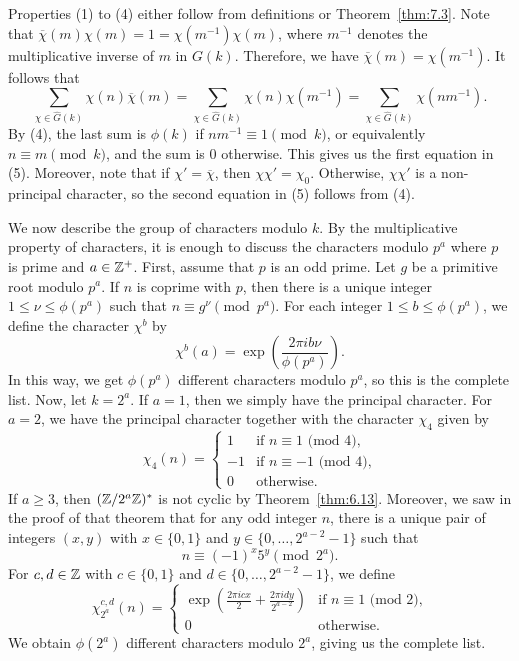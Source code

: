 \newpage 
\begin{pf}
    Properties (1) to (4) either follow from definitions or Theorem~\ref{thm:7.3}. 
    Note that $\overline\chi(m) \chi(m) = 1 = \chi(m^{-1}) \chi(m)$, 
    where $m^{-1}$ denotes the multiplicative inverse of $m$ in $G(k)$. Therefore, 
    we have $\overline\chi(m) = \chi(m^{-1})$. It follows that 
    \[ \sum_{\chi\in\hat G(k)} \chi(n) \overline\chi(m) 
    = \sum_{\chi\in\hat G(k)} \chi(n) \chi(m^{-1}) 
    = \sum_{\chi\in\hat G(k)} \chi(nm^{-1}). \] 
    By (4), the last sum is $\phi(k)$ if $nm^{-1} \equiv 1 \pmod k$, or equivalently 
    $n \equiv m \pmod k$, and the sum is $0$ otherwise. This gives us the first 
    equation in (5). Moreover, note that if $\chi' = \overline\chi$, then 
    $\chi\chi' = \chi_0$. Otherwise, $\chi\chi'$ is a non-principal character, 
    so the second equation in (5) follows from (4). 
\end{pf}

We now describe the group of characters modulo $k$. By the multiplicative property 
of characters, it is enough to discuss the characters modulo $p^a$ where $p$ is 
prime and $a \in \mathbb{Z}^+$. First, assume that $p$ is an odd prime. Let $g$ be a 
primitive root modulo $p^a$. If $n$ is coprime with $p$, then there is a unique 
integer $1 \leq \nu \leq \phi(p^a)$ such that $n \equiv g^\nu \pmod{p^a}$. 
For each integer $1 \leq b \leq \phi(p^a)$, we define the character $\chi^b$ by 
\[ \chi^b(a) = \exp\left( \frac{2\pi ib\nu}{\phi(p^a)} \right). \] 
In this way, we get $\phi(p^a)$ different characters modulo $p^a$, so this is the 
complete list. Now, let $k = 2^a$. If $a = 1$, then we simply have the principal 
character. For $a = 2$, we have the principal character together with the character 
$\chi_4$ given by 
\[ \chi_4(n) = \begin{cases}
    1 & \text{if } n \equiv 1 \text{ (mod $4$),} \\ 
    -1 & \text{if } n \equiv -1 \text{ (mod $4$),} \\ 
    0 & \text{otherwise.}
\end{cases} \] 
If $a \geq 3$, then $(\mathbb{Z}/2^a\mathbb{Z})^*$ is not cyclic by Theorem~\ref{thm:6.13}. 
Moreover, we saw in the proof of that theorem that for any odd integer $n$, 
there is a unique pair of integers $(x, y)$ with $x \in \{0, 1\}$ and 
$y \in \{0, \dots, 2^{a-2}-1\}$ such that 
\[ n \equiv (-1)^x 5^y \pmod{2^a}. \] 
For $c, d \in \mathbb{Z}$ with $c \in \{0, 1\}$ and $d \in \{0, \dots, 2^{a-2}-1\}$, we define 
\[ \chi_{2^a}^{c,d}(n) = \begin{cases}
    \exp(\frac{2\pi icx}2 + \frac{2\pi idy}{2^{a-2}}) & \text{if } n \equiv 1 
    \text{ (mod $2$),} \\ 
    0 & \text{otherwise.} 
\end{cases} \] 
We obtain $\phi(2^a)$ different characters modulo $2^a$, giving us the complete list. 

